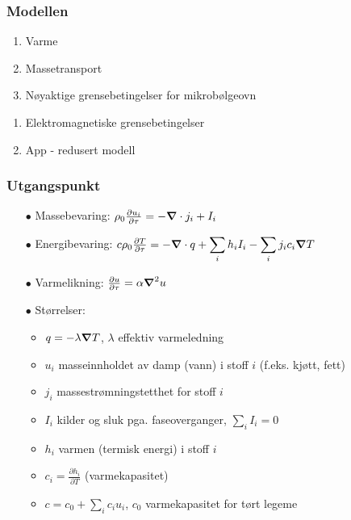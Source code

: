 \documentclass[screen]{beamer}
\newcommand{\gv}[1]{\ensuremath{\mbox{\boldmath$ #1 $}}}
\renewcommand{\div}[1]{\gv{\nabla} \cdot #1} %
\newcounter{saveenumi}
\begin{document}
\begin{frame}
  \frametitle{Modellen}
  \begin{enumerate}
  \item Varme
  \item Massetransport
  \item Nøyaktige grensebetingelser for mikrobølgeovn
    \setcounter{saveenumi}{\theenumi}
\end{enumerate}
    \hline
\begin{enumerate}
    \setcounter{enumi}{\thesaveenumi}
  \item Elektromagnetiske grensebetingelser
  \item App - redusert modell
  \end{enumerate}
\end{frame}

\begin{frame}
  \frametitle{Utgangspunkt}
  \begin{itemize}
    \item[$\bullet$] Massebevaring: $\rho_0 \frac{\partial u_i}{\partial\tau} =
      -\div{j_i} + I_i $ \vspace{10pt}
    \item[$\bullet$] Energibevaring: $c\rho_0\frac{\partial T}{\partial \tau} =
      -\div{q} + \displaystyle\sum\limits_{i} h_i I_i -
      \displaystyle\sum\limits_{i} j_i c_i {\gv\nabla} T$
    \item[$\bullet$] Varmelikning: $\frac{\partial u}{\partial \tau} = \alpha
      {\gv\nabla}^2 u$
    \item[$\bullet$] \vspace{10pt} Størrelser:
      \begin{itemize}
	\item $q = -\lambda {\gv \nabla } T$, $\lambda$ effektiv varmeledning
	\item $u_i$ masseinnholdet av damp (vann) i stoff $i$ (f.eks. kjøtt, fett)
	\item $j_i$ massestrømningstetthet for stoff $i$
	\item $I_i$ kilder og sluk pga. faseoverganger, $\displaystyle\sum\limits_{i} I_i = 0$
	\item $h_i$ varmen (termisk energi) i stoff $i$
	\item $c_i = \frac{\partial h_i}{\partial T}$ (varmekapasitet)
	\item $c = c_0 + \displaystyle\sum\limits_{i} c_i u_i$, $c_0$ varmekapasitet for tørt legeme
      \end{itemize}
  \end{itemize}
\end{frame}
\end{document}
